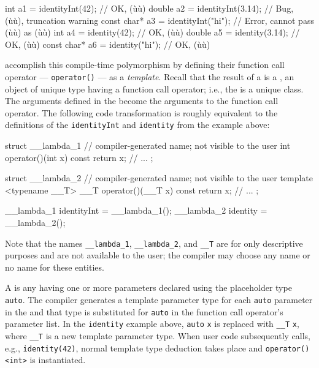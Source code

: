 \begin{emcppslisting}[emcppsbatch=e1]
int         a1 = identityInt(42);    // OK, (ù{}ù)
double      a2 = identityInt(3.14);  // Bug, (ù{}ù), truncation warning
const char* a3 = identityInt("hi");  // Error, cannot pass (ù{}ù) as (ù{}ù)
int         a4 = identity(42);       // OK, (ù{}ù)
double      a5 = identity(3.14);     // OK, (ù{}ù)
const char* a6 = identity("hi");     // OK, (ù{}ù)
\end{emcppslisting}
    

\noindent {} accomplish this compile-time polymorphism by
defining their function call operator --- \lstinline!operator()! --- as a
\emph{template}. Recall that the result of a  
is a , an object of unique type having a function
call operator; i.e., the  is a unique
 class. The arguments defined in the  become the arguments to the function call operator. The
following code transformation is roughly equivalent to the definitions
of the \lstinline!identityInt! and \lstinline!identity!  from the example above:

\begin{emcppslisting}
struct __lambda_1  // compiler-generated name; not visible to the user
{
    int operator()(int x) const { return x; }
    // ...
};

struct __lambda_2  // compiler-generated name; not visible to the user
{
    template <typename __T>
    __T operator()(__T x) const { return x; }
    // ...
};

__lambda_1 identityInt = __lambda_1();
__lambda_2 identity    = __lambda_2();
\end{emcppslisting}
    

\noindent Note that the names \lstinline!__lambda_1!, \lstinline!__lambda_2!, and
\lstinline!__T! are for only descriptive purposes and are not available
to the user; the compiler may choose any name or no name for these
entities.

A  is any  having one
or more parameters declared using the placeholder type \lstinline!auto!.
The compiler generates a template parameter type for each \lstinline!auto!
parameter in the  and that type is substituted
for \lstinline!auto! in the function call operator's parameter list. In the
\lstinline!identity! example above, \lstinline!auto! \lstinline!x! is replaced
with \lstinline!__T! \lstinline!x!, where \lstinline!__T! is a new template
parameter type. When user code subsequently calls, e.g.,
\lstinline!identity(42)!, normal template type deduction takes place and
\lstinline!operator()<int>! is instantiated.

